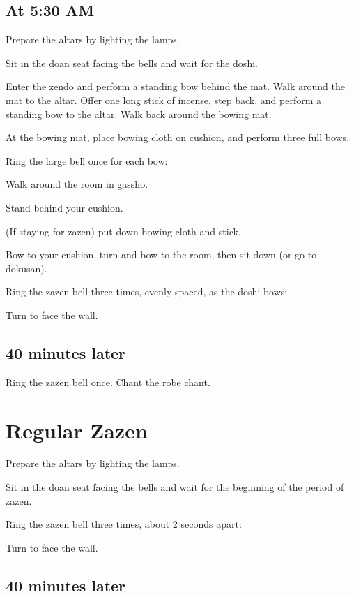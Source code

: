 \documentclass{chantbook}
\begin{document}
\renewcommand{\footmark}{\bellkey}
\section*{At 5:30 AM}

\doan Prepare the altars by lighting the lamps.

Sit in the doan seat facing the bells and wait for the doshi.

\doshi Enter the zendo and perform a standing bow behind the mat. Walk around
the mat to the altar. Offer one long stick of incense, step back, and perform a
standing bow to the altar. Walk back around the bowing mat.

At the bowing mat, place bowing cloth on cushion, and perform three full bows.

\doan Ring the large bell once for each bow:
\jundoBows

\doshi Walk around the room in gassho.

Stand behind your cushion.

(If staying for zazen) put down bowing cloth and stick.

Bow to your cushion, turn and bow to the room, then sit down (or go to dokusan).

\doan Ring the zazen bell three times, evenly spaced, as the doshi bows:
\jundoStartZazen

Turn to face the wall.

\section*{40 minutes later}
\doan Ring the zazen bell once. \bigspace\zazenbell
\sangha Chant the robe chant.

\chapter{Regular Zazen}
\doan Prepare the altars by lighting the lamps.

Sit in the doan seat facing the bells and wait for the beginning of the period
of zazen.

\doan Ring the zazen bell three times, about 2 seconds apart:
\startZazenBells

Turn to face the wall.

\section*{40 minutes later}
\end{document}
